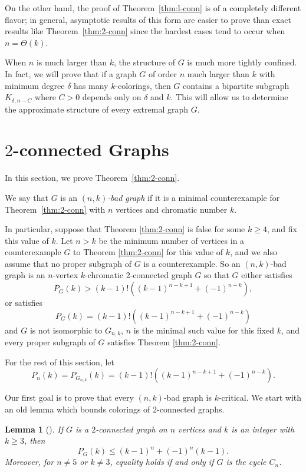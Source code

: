 \documentclass[11pt]{article}
\theoremstyle{plain}
\newtheorem{lemma}[theorem]{Lemma}
\theoremstyle{definition}
\theoremstyle{remark}
\begin{document}
On the other hand, the proof of Theorem~\ref{thm:l-conn} is of a completely different flavor; in general, asymptotic results of this form are easier to prove than exact results like Theorem~\ref{thm:2-conn} since the hardest cases tend to occur when $n=\Theta(k)$. 

When $n$ is much larger than $k$, the structure of $G$ is much more tightly confined. In fact, we will prove that if a graph $G$ of order $n$ much larger than $k$ with minimum degree $\delta$ has many $k$-colorings, then $G$ contains a bipartite subgraph $K_{\delta, n-C}$ where $C>0$ depends only on $\delta$ and $k$. This will allow us to determine the approximate structure of every extremal graph $G$.
\section{$2$-connected Graphs}\label{sec:2-conn}
In this section, we prove Theorem~\ref{thm:2-conn}.

We say that $G$ is an {\it $(n,k)$-bad graph}  if it is a minimal counterexample for Theorem~\ref{thm:2-conn} with $n$ vertices and chromatic number $k$. 

In particular, suppose that Theorem \ref{thm:2-conn} is false for some $k \geq 4$, and fix this value of $k$.  Let $n>k$ be the minimum number of vertices in a counterexample $G$ to Theorem \ref{thm:2-conn} for this value of $k$, and we also assume that no proper subgraph of $G$ is a counterexample.  So an $(n,k)$-bad graph is an $n$-vertex $k$-chromatic $2$-connected graph $G$ so that $G$ either satisfies
\[
P_G(k) > (k-1)!\left((k-1)^{n-k+1}+(-1)^{n-k}\right),
\]
or satisfies
\[
P_G(k) = (k-1)!\left((k-1)^{n-k+1}+(-1)^{n-k}\right)
\]
and $G$ is not isomorphic to $G_{n,k}$, $n$ is the minimal such value for this fixed $k$, and every proper subgraph of $G$ satisfies Theorem \ref{thm:2-conn}. 

For the rest of this section, let 
\[
P_n(k) = P_{G_{n,k}}(k) = (k-1)!((k-1)^{n-k+1}+(-1)^{n-k}).
\]

Our first goal is to prove that every $(n,k)$-bad graph is $k$-critical. We start with an old lemma which bounds colorings of $2$-connected graphs.

\begin{lemma}[\cite{EngGal,To94}]\label{2connLem} If $G$ is a $2$-connected graph on $n$ vertices and $k$ is an integer with $k\geq 3$,  then 
\[
P_G(k)\leq (k-1)^{n}+(-1)^{n}(k-1).
\]
Moreover, for $n\neq 5$ or $k \neq 3$,  equality holds if and only if $G$ is the cycle $C_n$.
\end{lemma}
\end{document}
